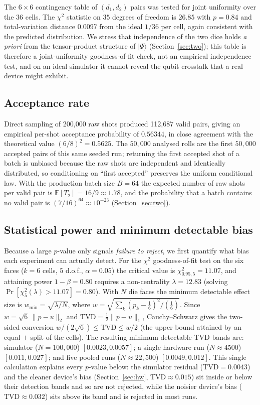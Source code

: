 \documentclass[journal]{IEEEtran}
\begin{document}
The $6\times 6$ contingency table of $(d_1,d_2)$ pairs was tested for joint uniformity over the $36$ cells. The $\chi^2$ statistic on $35$ degrees of freedom is $26.85$ with $p=0.84$ and total-variation distance $0.0097$ from the ideal $1/36$ per cell, again consistent with the predicted distribution. We stress that independence of the two dice holds \emph{a priori} from the tensor-product structure of $|\Psi\rangle$ (Section~\ref{sec:two}); this table is therefore a joint-uniformity goodness-of-fit check, not an empirical independence test, and on an ideal simulator it cannot reveal the qubit crosstalk that a real device might exhibit.

\subsection{Acceptance rate}

Direct sampling of 200{,}000 raw shots produced 112{,}687 valid pairs, giving an empirical per-shot acceptance probability of $0.56344$, in close agreement with the theoretical value $(6/8)^2=0.5625$. The $50{,}000$ analysed rolls are the first $50{,}000$ accepted pairs of this same seeded run; returning the first accepted shot of a batch is unbiased because the raw shots are independent and identically distributed, so conditioning on ``first accepted'' preserves the uniform conditional law. With the production batch size $B=64$ the expected number of raw shots per valid pair is $\mathbb{E}[T_2]=16/9\approx 1.78$, and the probability that a batch contains no valid pair is $(7/16)^{64}\approx 10^{-23}$ (Section~\ref{sec:two}).

\subsection{Statistical power and minimum detectable bias}
\label{sec:power}

Because a large $p$-value only signals \emph{failure to reject}, we first quantify what bias each experiment can actually detect. For the $\chi^2$ goodness-of-fit test on the six faces ($k=6$ cells, $5$ d.o.f., $\alpha=0.05$) the critical value is $\chi^2_{0.95,5}=11.07$, and attaining power $1-\beta=0.80$ requires a non-centrality $\lambda=12.83$ (solving $\Pr[\chi^2_5(\lambda)>11.07]=0.80$). With $N$ die faces the minimum detectable effect size is $w_{\min}=\sqrt{\lambda/N}$, where $w=\sqrt{\sum_{k}(p_k-\tfrac16)^2/(\tfrac16)}$. Since $w=\sqrt{6}\,\lVert p-u\rVert_2$ and $\mathrm{TVD}=\tfrac12\lVert p-u\rVert_1$, Cauchy--Schwarz gives the two-sided conversion $w/(2\sqrt{6})\le\mathrm{TVD}\le w/2$ (the upper bound attained by an equal $\pm$ split of the cells). The resulting minimum-detectable-TVD bands are: simulator ($N=100{,}000$) $[0.0023,0.0057]$; a single hardware run ($N\approx4500$) $[0.011,0.027]$; and five pooled runs ($N\approx22{,}500$) $[0.0049,0.012]$. This single calculation explains every $p$-value below: the simulator residual ($\mathrm{TVD}=0.0043$) and the cleaner device's bias (Section~\ref{sec:hw}, $\mathrm{TVD}\approx0.015$) sit inside or below their detection bands and so are not rejected, while the noisier device's bias ($\mathrm{TVD}\approx0.032$) sits above its band and is rejected in most runs.
\end{document}
